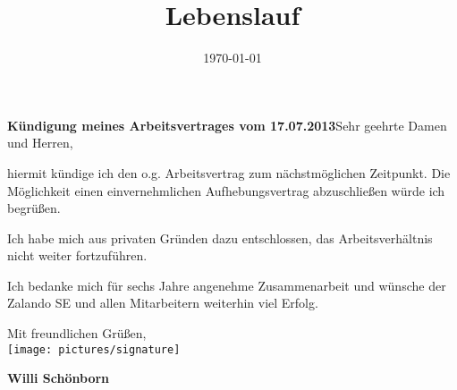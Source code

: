 \documentclass[11pt,a4paper,sans]{moderncv} %
\title{Lebenslauf}
\begin{document}


\clearpage

\date{\today} %
\opening{\textbf{Kündigung meines Arbeitsvertrages vom 17.07.2013}\newline{}\newline{}Sehr geehrte Damen und Herren,} %
\closing{} %

\makelettertitle %

hiermit kündige ich den o.g. Arbeitsvertrag zum nächstmöglichen Zeitpunkt. Die Möglichkeit einen einvernehmlichen Aufhebungsvertrag abzuschließen würde ich begrüßen.
 
Ich habe mich aus privaten Gründen dazu entschlossen, das Arbeitsverhältnis nicht weiter fortzuführen.

Ich bedanke mich für sechs Jahre angenehme Zusammenarbeit und wünsche der Zalando SE und allen Mitarbeitern weiterhin viel Erfolg.

Mit freundlichen Grüßen,\\[1.5em]
\texttt{[image: pictures/signature]}

\bfseries{Willi Schönborn}


\end{document}
